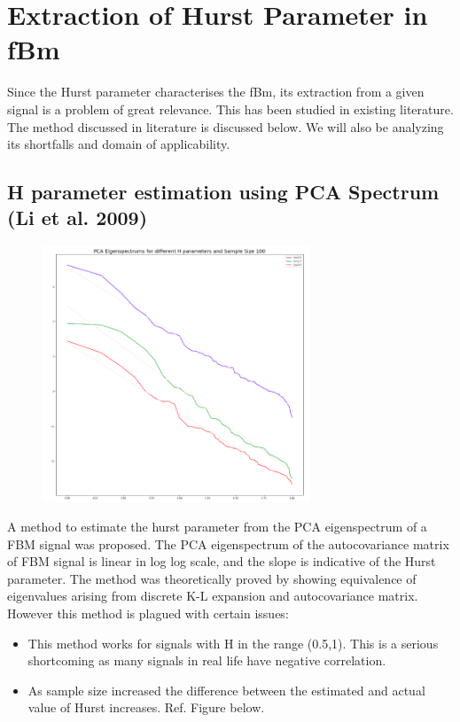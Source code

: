 \documentclass[a4paper]{article}
\begin{document}
\section{Extraction of Hurst Parameter in fBm}
Since the Hurst parameter characterises the fBm, its extraction from a given signal is a problem of great relevance. This has been studied in existing literature. The method discussed in literature is discussed below. We will also be analyzing its shortfalls and domain of applicability.

\subsection{H parameter estimation using PCA Spectrum (Li et al. 2009) \cite{DBLP:journals/tsp/LiHCZ09}}
\begin{figure}
\vspace{-15pt}
\includegraphics[width=8cm]{Li_1.png}
\end{figure} 
A method to estimate the hurst parameter from the PCA eigenspectrum of a FBM signal was proposed. The PCA eigenspectrum of the autocovariance matrix of FBM signal is linear in log log scale, and the slope is indicative of the Hurst parameter. The method was theoretically proved by showing equivalence of eigenvalues arising from discrete K-L expansion and autocovariance matrix. However this method is plagued with certain issues:
\begin{itemize}
\item This method works for signals with H in the range (0.5,1). This is a serious shortcoming as many signals in real life have negative correlation.
\item As sample size increased the difference between the estimated and actual value of Hurst increases. Ref. Figure below.
\end{itemize}
\end{document}
